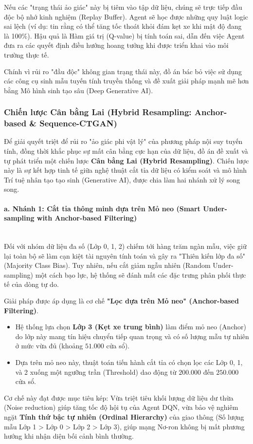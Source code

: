 Nếu các "trạng thái ảo giác" này bị tiêm vào tập dữ liệu, chúng sẽ trực tiếp đầu độc bộ nhớ kinh nghiệm (Replay Buffer). Agent sẽ học được những quy luật logic sai lệch (ví dụ: tin rằng có thể tăng tốc thoát khỏi đám kẹt xe khi mật độ đang là 100\%). Hậu quả là Hàm giá trị (Q-value) bị tính toán sai, dẫn đến việc Agent đưa ra các quyết định điều hướng hoang tưởng khi được triển khai vào môi trường thực tế.

Chính vì rủi ro "đầu độc" không gian trạng thái này, đồ án bác bỏ việc sử dụng các công cụ sinh mẫu tuyến tính truyền thống và đề xuất giải pháp mạnh mẽ hơn bằng Mô hình sinh tạo sâu (Deep Generative AI).

\subsubsection{Chiến lược Cân bằng Lai (Hybrid Resampling: Anchor-based \& Sequence-CTGAN)}

Để giải quyết triệt để rủi ro "ảo giác phi vật lý" của phương pháp nội suy tuyến tính, đồng thời khắc phục sự mất cân bằng cực hạn của dữ liệu, đồ án đề xuất và tự phát triển một chiến lược \textbf{Cân bằng Lai (Hybrid Resampling)}. Chiến lược này là sự kết hợp tinh tế giữa nghệ thuật cắt tỉa dữ liệu có kiểm soát và mô hình Trí tuệ nhân tạo tạo sinh (Generative AI), được chia làm hai nhánh xử lý song song.

\paragraph{a. Nhánh 1: Cắt tỉa thông minh dựa trên Mỏ neo (Smart Under-sampling with Anchor-based Filtering)} \mbox{} \\
Đối với nhóm dữ liệu đa số (Lớp 0, 1, 2) chiếm tới hàng trăm ngàn mẫu, việc giữ lại toàn bộ sẽ làm cạn kiệt tài nguyên tính toán và gây ra "Thiên kiến lớp đa số" (Majority Class Bias). Tuy nhiên, nếu cắt giảm ngẫu nhiên (Random Under-sampling) một cách bạo lực, hệ thống sẽ đánh mất các đặc trưng phân phối thực tế của dòng tự do.

Giải pháp được áp dụng là cơ chế \textbf{"Lọc dựa trên Mỏ neo" (Anchor-based Filtering)}.
\begin{itemize}
    \item Hệ thống lựa chọn \textbf{Lớp 3 (Kẹt xe trung bình)} làm điểm mỏ neo (Anchor) do lớp này mang tín hiệu chuyển tiếp quan trọng và có số lượng mẫu tự nhiên ở mức vừa đủ (khoảng $51.000$ cửa sổ).
    \item Dựa trên mỏ neo này, thuật toán tiến hành cắt tỉa có chọn lọc các Lớp 0, 1, và 2 xuống một ngưỡng trần (Threshold) dao động từ $200.000$ đến $250.000$ cửa sổ.
\end{itemize}
Cơ chế này đạt được mục tiêu kép: Vừa triệt tiêu khối lượng dữ liệu dư thừa (Noise reduction) giúp tăng tốc độ hội tụ của Agent DQN, vừa bảo vệ nghiêm ngặt \textbf{Tính thứ bậc tự nhiên (Ordinal Hierarchy)} của giao thông (Số lượng mẫu Lớp 1 > Lớp 0 > Lớp 2 > Lớp 3), giúp mạng Nơ-ron không bị mất phương hướng khi nhận diện bối cảnh bình thường.

